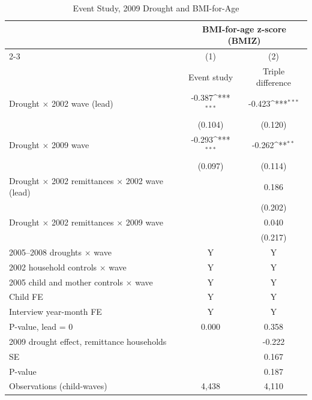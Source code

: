 \documentclass[12pt]{article}
\def\sym#1{\ifmmode^{#1}\else\(^{#1}\)\fi}
\begin{document}
\begin{longtable}{l*{2}{c}}
\caption{Event Study, 2009 Drought and BMI-for-Age}\\
\toprule
 & \multicolumn{2}{c}{BMI-for-age z-score (BMIZ)}\\
\cmidrule(lr){2-3}
            &\multicolumn{1}{c}{(1)}&\multicolumn{1}{c}{(2)}\\
            &\multicolumn{1}{c}{Event study}&\multicolumn{1}{c}{Triple difference}\\
\midrule
Drought \ensuremath{\times} 2002 wave (lead)&      -0.387\sym{***}&      -0.423\sym{***}\\
            &     (0.104)         &     (0.120)         \\
Drought \ensuremath{\times} 2009 wave&      -0.293\sym{***}&      -0.262\sym{**} \\
            &     (0.097)         &     (0.114)         \\
Drought \ensuremath{\times} 2002 remittances \ensuremath{\times} 2002 wave (lead)&                     &       0.186         \\
            &                     &     (0.202)         \\
Drought \ensuremath{\times} 2002 remittances \ensuremath{\times} 2009 wave&                     &       0.040         \\
            &                     &     (0.217)         \\
\midrule
2005--2008 droughts \ensuremath{\times} wave&           Y         &           Y         \\
2002 household controls \ensuremath{\times} wave&           Y         &           Y         \\
2005 child and mother controls \ensuremath{\times} wave&           Y         &           Y         \\
Child FE    &           Y         &           Y         \\
Interview year-month FE&           Y         &           Y         \\
P-value, lead = 0&       0.000         &       0.358         \\
\midrule 2009 drought effect, remittance households&                     &      -0.222         \\
\quad SE    &                     &       0.167         \\
\quad P-value&                     &       0.187         \\
\midrule Observations (child-waves)&       4,438         &       4,110         \\

\end{longtable}
\end{document}
